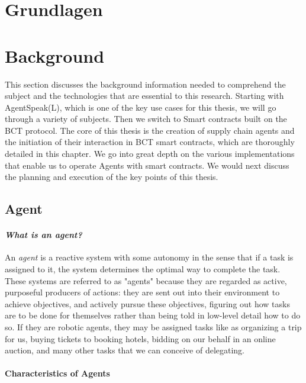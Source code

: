 {\chapter{Grundlagen}}
{\chapter{Background}}
\label{sec:background}


This section discusses the background information needed to comprehend the subject and the technologies that are essential to this research. Starting with AgentSpeak(L), which is one of the key use cases for this thesis, we will go through a variety of subjects. Then we switch to Smart contracts built on the \ac{BCT} protocol. The core of this thesis is the creation of supply chain agents and the initiation of their interaction in \ac{BCT} smart contracts, which are thoroughly detailed in this chapter. We go into great depth on the various implementations that enable us to operate Agents with smart contracts. We would next discuss the planning and execution of the key points of this thesis.

\section{Agent}

\subsubsection{\textit{What is an agent?}}
An \textit{agent} is a reactive system with some autonomy in the sense that if a task is assigned to it, the system determines the optimal way to complete the task. These systems are referred to as "agents" because they are regarded as active, purposeful producers of actions: they are sent out into their environment to achieve objectives, and actively pursue these objectives, figuring out how tasks are to be done for themselves rather than being told in low-level detail how to do so. If they are robotic agents, they may be assigned tasks like as organizing a trip for us, buying tickets to booking hotels, bidding on our behalf in an online auction, and many other tasks that we can conceive of delegating.


\subsubsection{Characteristics of Agents}

